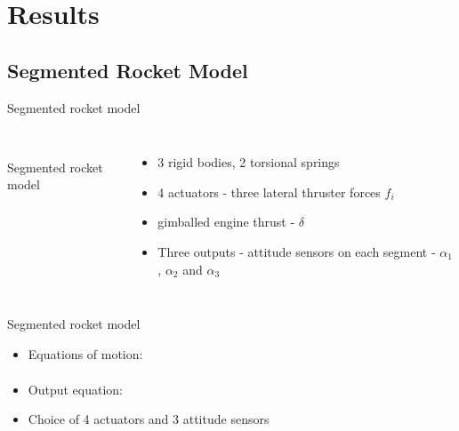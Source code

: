 \documentclass{beamer}
\begin{document}
\section{Results}

\subsection{Segmented Rocket Model}

\begin{frame}{Segmented rocket model}
\begin{columns} %
\centering
 \\
Segmented rocket model
\begin{itemize}
\item 3 rigid bodies, 2 torsional springs
\item 4 actuators - three lateral thruster forces $f_i$
\item gimballed engine thrust - $\delta$
\item Three outputs - attitude sensors on each segment - $\alpha_1$, $\alpha_2$ and $\alpha_3$
\end{itemize}
\end{columns}
\end{frame}

\begin{frame}{Segmented rocket model}
\begin{itemize}
\item Equations of motion:
\begin{multline}

\end{multline}
\item Output equation:
\begin{equation}

\end{equation}
\item Choice of 4 actuators and 3 attitude sensors
\end{itemize}
\end{frame}
\end{document}
